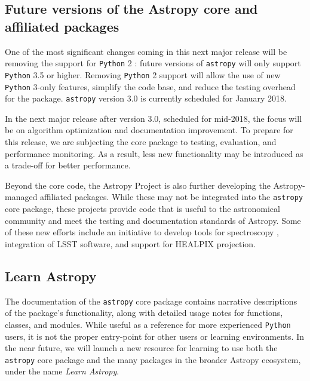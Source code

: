 \documentclass[modern]{aastex62}
\newcommand{\package}[1]{\texttt{#1}\xspace}
\newcommand{\python}{\package{Python}}
\newcommand{\astropy}{Astropy\xspace}
\newcommand{\astropypkg}{\package{astropy}}
\newcommand{\inlinecomment}[2]{\todo[inline]{#1: #2}\xspace}
\begin{document}
\subsection{Future versions of the Astropy core and affiliated packages}

One of the most significant changes coming in this next major release will be
removing the support for \python 2 \citep{ape10}: future versions of \astropypkg
will only support \python 3.5 or higher.
Removing \python 2 support will allow the use of new \python 3-only features,
simplify the code base, and reduce the testing overhead for the package.
\astropypkg version 3.0 is currently scheduled for January 2018.

In the next major release after version 3.0, scheduled for
mid-2018, the focus will be on algorithm optimization and
documentation improvement.
To prepare for this release, we are subjecting the core package to testing,
evaluation, and performance monitoring.
As a result, less new functionality may be introduced as a trade-off for
better performance.

Beyond the core code, the \astropy Project is also further developing the
\astropy-managed affiliated packages.
While these may not be integrated into the \astropypkg core package, these
projects provide code that is useful to the astronomical community and meet the
testing and documentation standards of \astropy.
Some of these new efforts include an initiative to develop tools for
spectroscopy \citep[\package{specutils}, \package{specreduc}, \package{specviz}]
{ape13}, integration of LSST software, and support for HEALPIX
projection. %

\subsection{Learn Astropy}

The documentation of the \astropypkg core package contains narrative descriptions of
the package's functionality, along with detailed usage notes for functions,
classes, and modules.
While useful as a reference for more experienced \python users, it is not the
proper entry-point for other users or learning environments.
In the near future, we will launch a new resource for learning to use both the
\astropypkg core package and the many packages in the broader \astropy
ecosystem, under the name \emph{Learn Astropy}.
\end{document}
